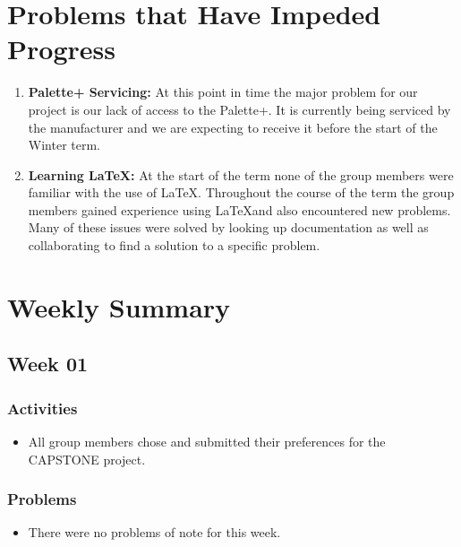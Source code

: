 \documentclass[letterpaper, onecolumn, draftclsnofoot, 10pt, compsoc]{IEEEtran}
\begin{document}
\begin{singlespace}
\section{Problems that Have Impeded Progress}
	\begin{enumerate}
	\item\textbf{Palette+ Servicing:} At this point in time the major problem for our project is our lack of access to the Palette+. It is currently being serviced by the manufacturer and we are expecting to receive it before the start of the Winter term.
    \item\textbf{Learning \LaTeX:} At the start of the term none of the group members were familiar with the use of \LaTeX. Throughout the course of the term the group members gained experience using \LaTeX and also encountered new problems. Many of these issues were solved by looking up documentation as well as collaborating to find a solution to a specific problem. 
	\end{enumerate}
    
\section{Weekly Summary}

	\subsection{Week 01}
    	\subsubsection{Activities}
        	\begin{itemize}
        	\item All group members chose and submitted their preferences for the CAPSTONE project. 
        	\end{itemize}
        \subsubsection{Problems}
       	\begin{itemize}
        	\item There were no problems of note for this week.
        	\end{itemize}
        

\end{singlespace}
\end{document}
